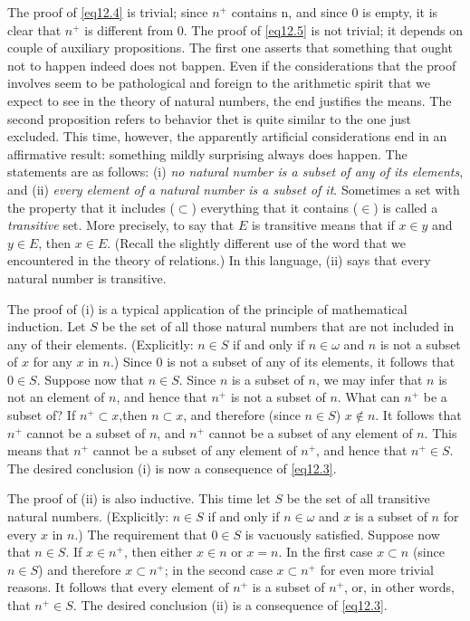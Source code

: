 The proof of \eqref{eq12.4} is trivial; since $n^{+}$ contains n, and since $0$ is empty, it is clear that $n^{+}$ is different from $0$. The proof of \eqref{eq12.5} is not trivial; it depends on couple of auxiliary propositions. The first one asserts that something that ought not to happen indeed does not bappen. Even if the considerations that the proof involves seem to be pathological and foreign to the arithmetic spirit that we expect to see in the theory of natural numbers, the end justifies the means. The second proposition refers to behavior thet is quite similar to the one just excluded. This time, however, the apparently artificial considerations end in an affirmative result: something mildly surprising always does happen. The statements are as follows: (i) \textit{no natural number is a subset of any of its elements}, and  (ii) \textit{every element of a natural number is a subset of it}. Sometimes a set with the property that it includes ($\subset$) everything that it contains ($\in$) is called a \textit{transitive} set. More precisely, to say that $E$ is transitive means that if $x \in y$ and $y \in E$, then $x \in E$. (Recall the slightly different use of the word that we encountered in the theory of relations.) In this language, (ii) says that every natural number is transitive. 

The proof of (i) is a typical application of the principle of mathematical induction. Let $S$ be the set of all those natural numbers that are not included in any of their elements. (Explicitly: $n \in S$ if and only if $n \in \omega$ and $n$ is not a subset of $x$ for any $x$ in $n$.) Since $0$ is not a subset of any of its elements, it follows that $0 \in S$.  Suppose now that $n \in S$. Since $n$ is a subset of $n$, we may infer that $n$ is not an element of $n$, and hence that $n^{+}$ is not a subset of $n$. What can $n^{+}$ be a subset of? If $n^{+} \subset x$,then $n \subset x$, and therefore (since $n \in S$) $x \notin n$. It follows that $n^{+}$ cannot be a subset of $n$, and $n^{+}$ cannot be a subset of any element of $n$. This means that $n^{+}$ cannot be a subset of any element of $n^{+}$, and hence that $n^{+} \in S$. The desired conclusion (i) is now a consequence of \eqref{eq12.3}. 

The proof of (ii) is also inductive. This time let $S$ be the set of all transitive natural numbers. (Explicitly: $n \in S$ if and only if $n \in \omega$ and $x$ is a subset of $n$ for every $x$ in $n$.) The requirement that $0 \in S$ is vacuously satisfied.  Suppose now that $n \in S$. If $x \in n^{+}$, then either $x \in n$ or $x = n$. In the first case $x \subset n$ (since $n \in S$) and therefore $x \subset n^{+}$; in the second case $x \subset n^{+}$ for even more trivial reasons. It follows that every element of $n^{+}$ is a subset of $n^{+}$, or, in other words, that $n^{+} \in S$. The desired conclusion (ii) is a consequence of \eqref{eq12.3}. 

